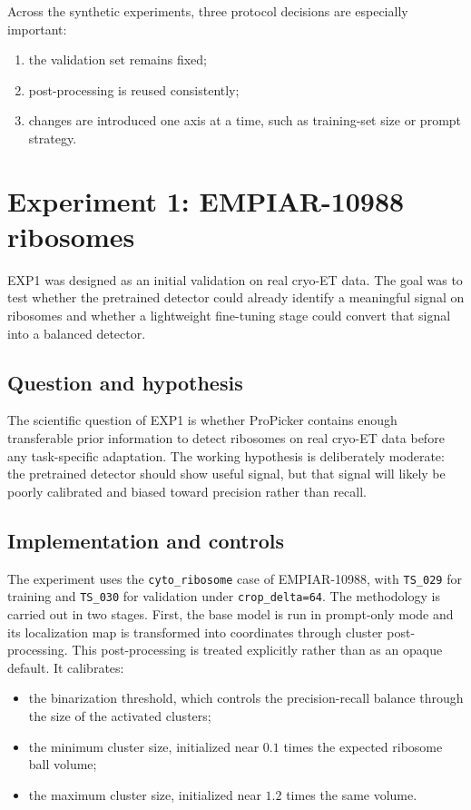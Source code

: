 \documentclass[12pt,a4paper]{report}
\begin{document}
Across the synthetic experiments, three protocol decisions are especially important:
\begin{enumerate}
  \item the validation set remains fixed;
  \item post-processing is reused consistently;
  \item changes are introduced one axis at a time, such as training-set size or prompt strategy.
\end{enumerate}

\section{Experiment 1: EMPIAR-10988 ribosomes}
EXP1 was designed as an initial validation on real cryo-ET data. The goal was to test whether the pretrained detector could already identify a meaningful signal on ribosomes and whether a lightweight fine-tuning stage could convert that signal into a balanced detector.

\subsection{Question and hypothesis}
The scientific question of EXP1 is whether ProPicker contains enough transferable prior information to detect ribosomes on real cryo-ET data before any task-specific adaptation. The working hypothesis is deliberately moderate: the pretrained detector should show useful signal, but that signal will likely be poorly calibrated and biased toward precision rather than recall.

\subsection{Implementation and controls}
The experiment uses the \texttt{cyto\_ribosome} case of EMPIAR-10988, with \texttt{TS\_029} for training and \texttt{TS\_030} for validation under \texttt{crop\_delta=64}. The methodology is carried out in two stages. First, the base model is run in prompt-only mode and its localization map is transformed into coordinates through cluster post-processing. This post-processing is treated explicitly rather than as an opaque default. It calibrates:
\begin{itemize}
  \item the binarization threshold, which controls the precision-recall balance through the size of the activated clusters;
  \item the minimum cluster size, initialized near \(0.1\) times the expected ribosome ball volume;
  \item the maximum cluster size, initialized near \(1.2\) times the same volume.
\end{itemize}
\end{document}
